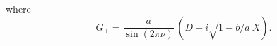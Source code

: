 \documentclass[12pt]{article}
\newcommand{\lt}{\left}
\newcommand{\rt}{\right}
\newcommand*{\bra}[1]{\langle{#1}|}
\newcommand*{\ket}[1]{|{#1}\rangle}
\newcommand{\lar}{{\leftarrow}}
\newcommand{\rar}{{\rightarrow}}
\begin{document}
where
\begin{equation}
G_{\pm}=\frac{a}{\sin(2\pi\nu)}\,\lt(D\pm i\sqrt{1-b/a}\,X\rt).
\end{equation}
\end{document}

